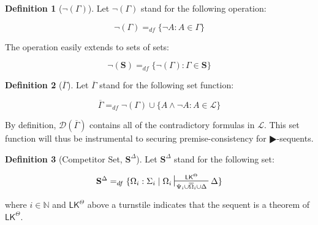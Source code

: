 \documentclass{article}
\theoremstyle{definition}
\theoremstyle{definition}
\theoremstyle{definition}
\theoremstyle{definition}
\newtheorem{definition}{Definition}
\theoremstyle{remark}
\theoremstyle{definition}
\theoremstyle{definition}
\begin{document}
\begin{definition}[$ \neg{(\Gamma)}  $]\label{nsetfunct}
	Let $ \neg{(\Gamma)} $ stand for the following operation:
	
	$$ \neg{(\Gamma)}   =_{df} \{\neg A : A \in \Gamma \} $$
	
	The operation easily extends to sets of sets:
	
	$$ \neg{(\mathbf{S})}   =_{df}  \{\neg (\Gamma) : \Gamma\in\mathbf{S} \} $$
	
		
\end{definition}


\begin{definition}[$ \overline{\Gamma}  $]\label{tildefunct}
	Let $ \overline{\Gamma}  $ stand for the following set function:
	
	$$ \overline{\Gamma}   =_{df} \neg(\Gamma) \cup \{ A\wedge\neg A : A \in \mathcal{L} \}$$
	
\end{definition}

By definition, $\mathcal{D}(\overline{\Gamma})$ contains all of the contradictory formulas in $\mathcal{L}$. This set function will thus be instrumental to securing premise-consistency for $\RHD$-sequents.

%	
%


\begin{definition}[Competitor Set, $ \mathbf{S}^{\Delta}  $]\label{competitor_set}
	Let  $ \mathbf{S}^{\Delta}  $ stand for the following set:
	
	$$   \mathbf{S}^{\Delta}  =_{df} \{\Omega_i : \Sigma_i \mid \Omega_i \sststile{\Psi_i\cup\overline{\Omega}_i \cup \Delta}{\mathsf{LK}^\Theta} \Delta  \}$$
	
	where $i \in \mathbb{N} $ and $\mathsf{LK}^\Theta$ above a turnstile indicates that the sequent is a theorem of $\mathsf{LK}^\Theta$.
	
\end{definition}
\end{document}
